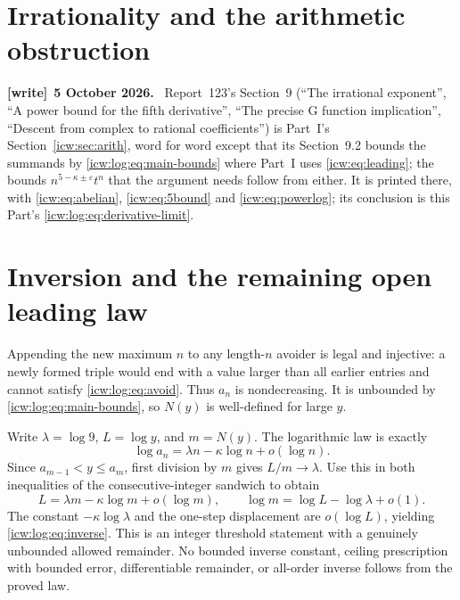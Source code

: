\documentclass[11pt,letterpaper]{article}
\theoremstyle{remark}\newtheorem{remark}[theorem]{Remark}
\newcommand{\eps}{\varepsilon}
\newcommand{\1}{\mathbf1}
\newenvironment{writenote}[1][]{\par\smallskip\begingroup\small
 \noindent\textbf{[write]}\if\relax\detokenize{#1}\relax\else~\textbf{#1.}\fi\ }%
 {\par\endgroup\smallskip}
\begin{document}
\section{Irrationality and the arithmetic obstruction}\label{icw:log:sec:arith}
\begin{writenote}[5 October 2026]
Report~123's Section~9 (``The irrational exponent'', ``A power bound for the fifth derivative'', ``The precise G function implication'', ``Descent from complex to rational coefficients'') is Part~I's Section~\ref{icw:sec:arith}, word for word except that its Section~9.2 bounds the summands by \eqref{icw:log:eq:main-bounds} where Part~I uses \eqref{icw:eq:leading}; the bounds $n^{5-\kappa\pm\eps}t^n$ that the argument needs follow from either. It is printed there, with \eqref{icw:eq:abelian}, \eqref{icw:eq:5bound} and \eqref{icw:eq:powerlog}; its conclusion is this Part's \eqref{icw:log:eq:derivative-limit}.
\end{writenote}

\section{Inversion and the remaining open leading law}\label{icw:log:sec:inverse}
Appending the new maximum $n$ to any length-$n$ avoider is legal and
injective: a newly formed triple would end with a value larger than all
earlier entries and cannot satisfy \eqref{icw:log:eq:avoid}. Thus $a_n$ is
nondecreasing. It is unbounded by \eqref{icw:log:eq:main-bounds}, so $N(y)$ is
well-defined for large $y$.

Write $\lambda=\log9$, $L=\log y$, and $m=N(y)$. The logarithmic law
is exactly
\[
 \log a_n=\lambda n-\kappa\log n+o(\log n).
\]
Since $a_{m-1}<y\le a_m$, first division by $m$ gives $L/m\to\lambda$.
Use this in both inequalities of the consecutive-integer sandwich to
obtain
\[
 L=\lambda m-\kappa\log m+o(\log m),\qquad
 \log m=\log L-\log\lambda+o(1).
\]
The constant $-\kappa\log\lambda$ and the one-step displacement are
$o(\log L)$, yielding \eqref{icw:log:eq:inverse}. This is an integer threshold
statement with a genuinely unbounded allowed remainder. No bounded
inverse constant, ceiling prescription with bounded error, differentiable
remainder, or all-order inverse follows from the proved law.
\end{document}
